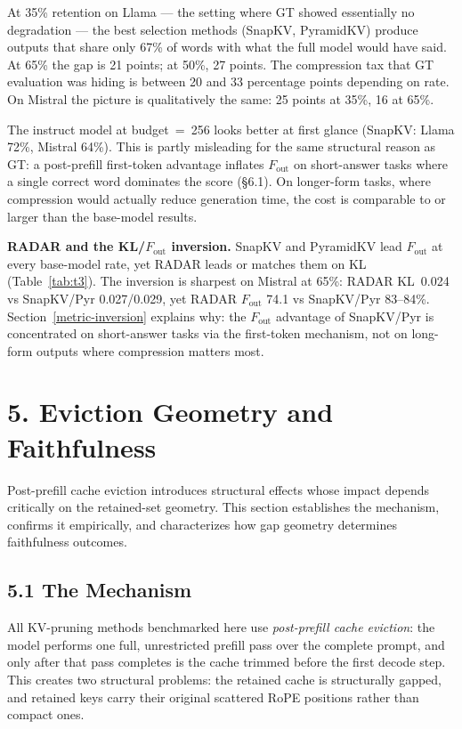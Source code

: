 \documentclass[10pt,letterpaper]{article}
\begin{document}
At 35\% retention on Llama --- the setting where GT showed essentially no degradation ---
the best selection methods (SnapKV, PyramidKV) produce outputs that share only 67\% of
words with what the full model would have said. At 65\% the gap is 21 points; at 50\%,
27 points. The compression tax that GT evaluation was hiding is between 20 and 33
percentage points depending on rate. On Mistral the picture is qualitatively the same:
25 points at 35\%, 16 at 65\%.

The instruct model at budget~=~256 looks better at first glance (SnapKV: Llama 72\%,
Mistral 64\%). This is partly misleading for the same structural reason as GT: a
post-prefill first-token advantage inflates \(F_{\text{out}}\) on short-answer tasks
where a single correct word dominates the score (§6.1). On longer-form tasks, where
compression would actually reduce generation time, the cost is comparable to or larger
than the base-model results.

\textbf{RADAR and the KL/\(F_{\text{out}}\) inversion.}
SnapKV and PyramidKV lead \(F_{\text{out}}\) at every base-model rate, yet RADAR leads
or matches them on KL (Table~\ref{tab:t3}). The inversion is sharpest on Mistral at
65\%: RADAR KL~0.024 vs SnapKV/Pyr 0.027/0.029, yet RADAR \(F_{\text{out}}\) 74.1 vs
SnapKV/Pyr 83--84\%. Section~\ref{metric-inversion} explains why: the \(F_{\text{out}}\)
advantage of SnapKV/Pyr is concentrated on short-answer tasks via the first-token
mechanism, not on long-form outputs where compression matters most.

\hypertarget{eviction-geometry-and-faithfulness}{%
\section{5. Eviction Geometry and Faithfulness}\label{eviction-geometry-and-faithfulness}}

Post-prefill cache eviction introduces structural effects whose impact depends critically
on the retained-set geometry. This section establishes the mechanism, confirms it
empirically, and characterizes how gap geometry determines faithfulness outcomes.

\hypertarget{the-mechanism}{%
\subsection{5.1 The Mechanism}\label{the-mechanism}}

All KV-pruning methods benchmarked here use \emph{post-prefill cache
eviction}: the model performs one full, unrestricted prefill pass over
the complete prompt, and only after that pass completes is the cache
trimmed before the first decode step. This creates two structural
problems: the retained cache is structurally gapped, and retained keys
carry their original scattered RoPE positions rather than compact ones.
\end{document}

